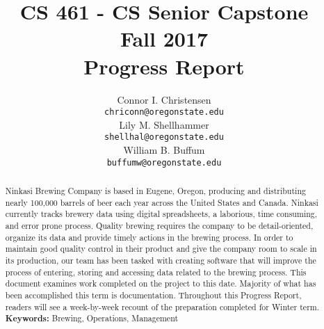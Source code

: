 \documentclass[draftclsnofoot,onecolumn,letterpaper,10pt,compsoc]{IEEEtran}
\title{CS 461 - CS Senior Capstone
	\\Fall 2017
	\\Progress Report
}
\author{
	Connor I. Christensen \\
	\texttt{chriconn@oregonstate.edu}
	\\
	Lily M. Shellhammer \\
	\texttt{shellhal@oregonstate.edu}
	\\
	William B. Buffum \\
	\small{}
	\texttt{buffumw@oregonstate.edu}
}
\begin{document}
\begin{titlingpage}
    \maketitle
    \begin{abstract}
			Ninkasi Brewing Company is based in Eugene, Oregon, producing and distributing nearly 100,000 barrels of beer each year across the United States and Canada.
			Ninkasi currently tracks brewery data using digital spreadsheets, a laborious, time consuming, and error prone process.
			Quality brewing requires the company to be detail-oriented, organize its data and provide timely actions in the brewing process.
			In order to maintain good quality control in their product and give the company room to scale in its production, our team has been tasked with creating software that will improve the process of entering, storing and accessing data related to the brewing process.
			This document examines work completed on the project to this date.
			Majority of what has been accomplished this term is documentation.
			Throughout this Progress Report, readers will see a week-by-week recount of the preparation completed for Winter term.
			\\
			\textbf{Keywords:} Brewing, Operations, Management
    \end{abstract}
		\pagebreak
		\tableofcontents
\end{titlingpage}
\end{document}
